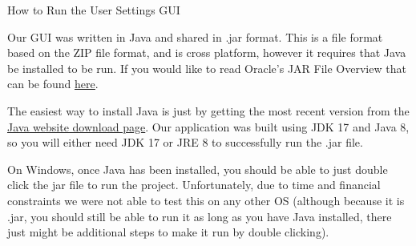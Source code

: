 \documentclass{article}
\begin{document}
\begin{center}
\Large{How to Run the User Settings GUI}
\end{center}
Our GUI was written in Java and shared in .jar format. This is a file format based on the ZIP file format, and is cross platform, however it requires that Java be installed to be run. If you would like to read Oracle's JAR File Overview that can be found \href{https://docs.oracle.com/javase/8/docs/technotes/guides/jar/jarGuide.html}{\underline{here}}.

The easiest way to install Java is just by getting the most recent version from the \href{https://www.java.com/en/download/}{\underline{Java website download page}}. Our application was built using JDK 17 and Java 8, so you will either need JDK 17 or JRE 8 to successfully run the .jar file.

On Windows, once Java has been installed, you should be able to just double click the jar file to run the project. Unfortunately, due to time and financial constraints we were not able to test this on any other OS (although because it is .jar, you should still be able to run it as long as you have Java installed, there just might be additional steps to make it run by double clicking).
\end{document}
